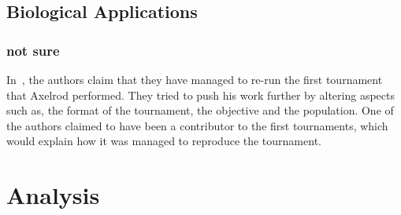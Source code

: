\documentclass{article}
\begin{document}
\subsection{Biological Applications}


\subsubsection{not sure}
In~\cite{Rapoport2015}, the authors claim that they have managed to 
re-run the first tournament that Axelrod performed. They tried to push his work
further by altering aspects such as, the format of the tournament, the objective
and the population. One of the authors claimed to have been a contributor
to the first tournaments, which would explain how it was managed to reproduce
the tournament.

\section{Analysis}\label{section:analysis}



\end{document}

